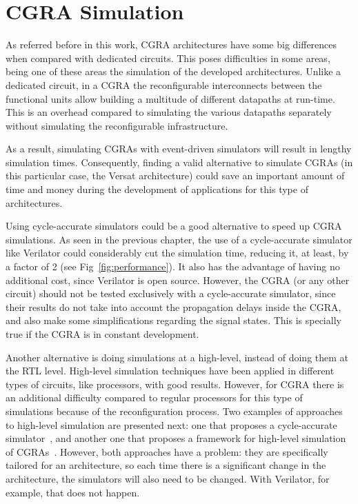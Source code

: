 \section{CGRA Simulation}
\label{section:CGRA}

As referred before in this work, \ac{CGRA} architectures have some big
differences when compared with dedicated circuits. This poses difficulties in
some areas, being one of these areas the simulation of the developed
architectures. Unlike a dedicated circuit, in a \ac{CGRA} the reconfigurable
interconnects between the functional units allow building a multitude of
different datapaths at run-time. This is an overhead compared to simulating the
various datapaths separately without simulating the reconfigurable
infrastructure.

As a result, simulating CGRAs with event-driven simulators will result in
lengthy simulation times. Consequently, finding a valid alternative to simulate
\ac{CGRA}s (in this particular case, the Versat architecture) could save an
important amount of time and money during the development of applications for
this type of architectures.

Using cycle-accurate simulators could be a good alternative to speed up
\ac{CGRA} simulations. As seen in the previous chapter, the use of a
cycle-accurate simulator like Verilator could considerably cut the simulation
time, reducing it, at least, by a factor of 2 (see
Fig~\ref{fig:performance}). It also has the advantage of having no additional
cost, since Verilator is open source. However, the \ac{CGRA} (or any other
circuit) should not be tested exclusively with a cycle-accurate simulator, since
their results do not take into account the propagation delays inside the
\ac{CGRA}, and also make some simplifications regarding the signal states. This
is specially true if the \ac{CGRA} is in constant development.

Another alternative is doing simulations at a high-level, instead of doing them
at the \ac{RTL} level. High-level simulation techniques have been applied in
different types of circuits, like processors, with good results. However, for
\ac{CGRA} there is an additional difficulty compared to regular processors for
this type of simulations because of the reconfiguration process. Two examples of
approaches to high-level simulation are presented next: one that proposes a
cycle-accurate simulator~\cite{chen:CGRA}, and another one that proposes a
framework for high-level simulation of \ac{CGRA}s~\cite{pasha:CGRA}. However,
both approaches have a problem: they are specifically tailored for an
architecture, so each time there is a significant change in the architecture,
the simulators will also need to be changed. With Verilator, for example, that
does not happen.


